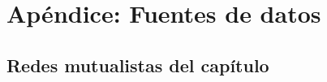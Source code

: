 
\chapter{Apéndice: Fuentes de datos} %

\label{APP_DATOS} %

\section{Redes mutualistas del capítulo \label{ChapterESTATICA}}